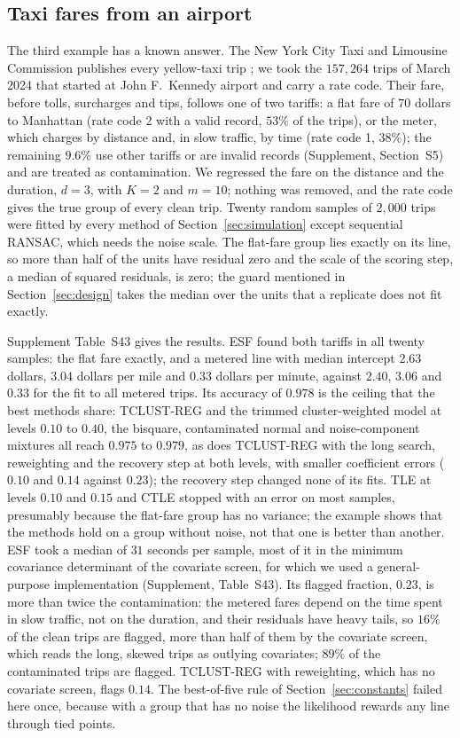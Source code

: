 \subsection{Taxi fares from an airport}
\label{sec:taxi}

The third example has a known answer. The New York City Taxi and Limousine Commission publishes
every yellow-taxi trip \citep{tlc2024trip}; we took the $157{,}264$ trips of March 2024 that
started at John F.\ Kennedy airport and carry a rate code. Their fare, before tolls, surcharges
and tips, follows one of two tariffs: a flat fare of $70$ dollars to Manhattan (rate code 2
with a valid record, $53\%$ of the trips), or the meter, which charges by distance and, in slow
traffic, by time (rate code 1, $38\%$); the remaining $9.6\%$ use other tariffs or are invalid
records (Supplement, Section~S5) and are treated as contamination. We regressed the fare on the
distance and the duration, $d=3$, with $K=2$ and $m=10$; nothing was removed, and the rate
code gives the true group of every clean trip. Twenty random samples of $2{,}000$ trips were
fitted by every method of Section~\ref{sec:simulation} except sequential RANSAC, which needs
the noise scale. The flat-fare group lies exactly on its line, so more than half of the units
have residual zero and the scale of the scoring step, a median of squared residuals, is zero;
the guard mentioned in Section~\ref{sec:design} takes the median over the units that a
replicate does not fit exactly.

Supplement Table~S43 gives the results. ESF found both tariffs in all twenty samples: the flat
fare exactly, and a metered line with median intercept $2.63$ dollars, $3.04$ dollars per mile
and $0.33$ dollars per minute, against $2.40$, $3.06$ and $0.33$ for the fit to all metered
trips. Its accuracy of $0.978$ is the ceiling that the best methods share: TCLUST-REG and the
trimmed cluster-weighted model at levels $0.10$ to $0.40$, the bisquare, contaminated normal and
noise-component mixtures all reach $0.975$ to $0.979$, as does TCLUST-REG with the long search,
reweighting and the recovery step at both levels, with smaller coefficient errors ($0.10$ and
$0.14$ against $0.23$); the recovery step changed none of its fits. TLE at levels $0.10$ and
$0.15$ and CTLE stopped with an error on most samples, presumably because the flat-fare group
has no variance; the example shows that the methods hold on a group without noise, not that
one is better than another. ESF took a median of $31$ seconds
per sample, most of it in the minimum covariance determinant of the covariate screen, for which
we used a general-purpose implementation (Supplement, Table~S43). Its flagged fraction, $0.23$, is more than twice the contamination: the metered fares depend on the
time spent in slow traffic, not on the duration, and their residuals have heavy tails, so
$16\%$ of the clean trips are flagged, more than half of them by the covariate screen, which
reads the long, skewed trips as outlying covariates; $89\%$ of the contaminated trips are
flagged. TCLUST-REG with reweighting, which has no covariate screen, flags $0.14$. The
best-of-five rule of Section~\ref{sec:constants} failed here once, because with a group that
has no noise the likelihood rewards any line through tied points.
